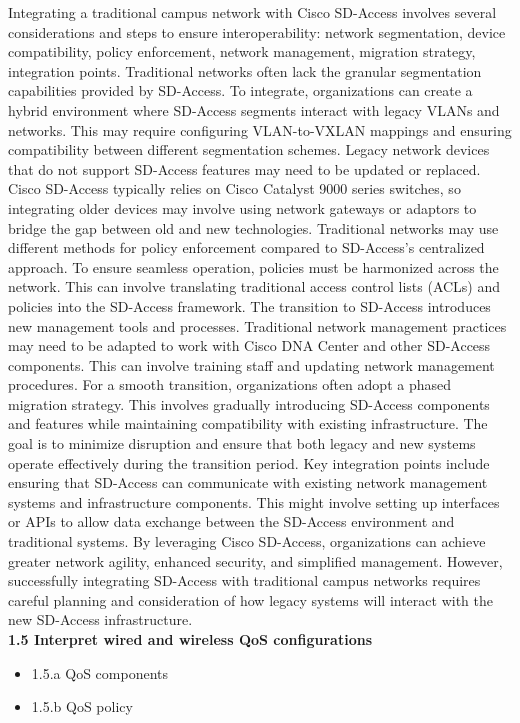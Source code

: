 \documentclass{article}
\begin{document}
	Integrating a traditional campus network with Cisco SD-Access involves several considerations and steps to ensure interoperability: network segmentation, device compatibility, policy enforcement, network management, migration strategy, integration points. Traditional networks often lack the granular segmentation capabilities provided by SD-Access. To integrate, organizations can create a hybrid environment where SD-Access segments interact with legacy VLANs and networks. This may require configuring VLAN-to-VXLAN mappings and ensuring compatibility between different segmentation schemes. Legacy network devices that do not support SD-Access features may need to be updated or replaced. Cisco SD-Access typically relies on Cisco Catalyst 9000 series switches, so integrating older devices may involve using network gateways or adaptors to bridge the gap between old and new technologies. Traditional networks may use different methods for policy enforcement compared to SD-Access’s centralized approach. To ensure seamless operation, policies must be harmonized across the network. This can involve translating traditional access control lists (ACLs) and policies into the SD-Access framework. The transition to SD-Access introduces new management tools and processes. Traditional network management practices may need to be adapted to work with Cisco DNA Center and other SD-Access components. This can involve training staff and updating network management procedures. For a smooth transition, organizations often adopt a phased migration strategy. This involves gradually introducing SD-Access components and features while maintaining compatibility with existing infrastructure. The goal is to minimize disruption and ensure that both legacy and new systems operate effectively during the transition period. Key integration points include ensuring that SD-Access can communicate with existing network management systems and infrastructure components. This might involve setting up interfaces or APIs to allow data exchange between the SD-Access environment and traditional systems. By leveraging Cisco SD-Access, organizations can achieve greater network agility, enhanced security, and simplified management. However, successfully integrating SD-Access with traditional campus networks requires careful planning and consideration of how legacy systems will interact with the new SD-Access infrastructure.\\

\textbf{1.5 Interpret wired and wireless QoS configurations}
\begin{itemize}
\item 1.5.a QoS components
\item 1.5.b QoS policy
\end{itemize}
\end{document}
